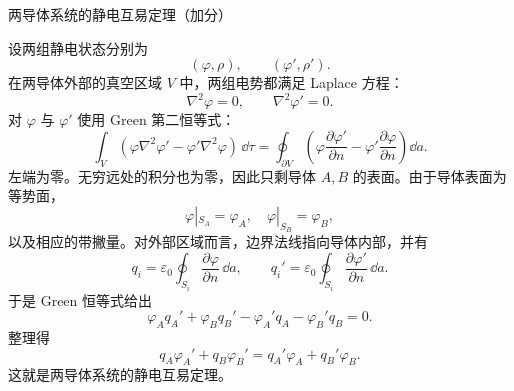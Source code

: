 \begin{question}
两导体系统的静电互易定理（加分）
\begin{solution}
设两组静电状态分别为
\[
  (\varphi,\rho),
  \qquad
  (\varphi',\rho').
\]
在两导体外部的真空区域 $V$ 中，两组电势都满足 Laplace 方程：
\[
  \nabla^2\varphi=0,
  \qquad
  \nabla^2\varphi'=0.
\]
对 $\varphi$ 与 $\varphi'$ 使用 Green 第二恒等式：
\[
  \int_V(\varphi\nabla^2\varphi'-\varphi'\nabla^2\varphi)\,\dd\tau
  =\oint_{\partial V}
  \left(\varphi\frac{\partial\varphi'}{\partial n}
  -\varphi'\frac{\partial\varphi}{\partial n}\right)\dd a.
\]
左端为零。无穷远处的积分也为零，因此只剩导体 $A,B$ 的表面。由于导体表面为等势面，
\[
  \varphi|_{S_A}=\varphi_A,
  \quad
  \varphi|_{S_B}=\varphi_B,
\]
以及相应的带撇量。对外部区域而言，边界法线指向导体内部，并有
\[
  q_i=\varepsilon_0\oint_{S_i}\frac{\partial\varphi}{\partial n}\,\dd a,
  \qquad
  q_i'=\varepsilon_0\oint_{S_i}\frac{\partial\varphi'}{\partial n}\,\dd a.
\]
于是 Green 恒等式给出
\[
  \varphi_Aq_A'+\varphi_Bq_B'
  -\varphi_A'q_A-\varphi_B'q_B=0.
\]
整理得
\[
  \boxed{
  q_A\varphi_A'+q_B\varphi_B'
  =q_A'\varphi_A+q_B'\varphi_B}.
\]
这就是两导体系统的静电互易定理。
\end{solution}
\end{question}
